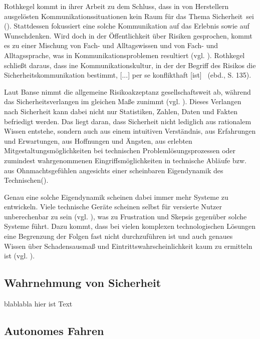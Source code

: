 Rothkegel kommt in ihrer Arbeit zu dem Schluss, dass in von Herstellern ausgelösten Kommunikationssituationen \glqq kein Raum für das Thema Sicherheit\grqq \, sei (\cite[132]{rothkegel2013sicherheitskommunikation}). Stattdessen fokussiert eine solche Kommunikation auf das Erlebnis sowie auf Wunschdenken. Wird doch in der Öffentlichkeit über Risiken gesprochen, kommt es zu einer Mischung von Fach- und Alltagswissen und von Fach- und Alltagssprache, was in Kommunikationsproblemen resultiert (vgl. \cite[134]{rothkegel2013sicherheitskommunikation}). Rothkegel schließt daraus, dass \glqq [e]ine Kommunikationskultur, in der der Begriff des Risikos die Sicherheitskommunikation bestimmt, [...] per se konflikthaft [ist] \grqq \, (ebd., S. 135).

Laut Banse nimmt die allgemeine Risikoakzeptanz gesellschaftsweit ab, während das Sicherheitsverlangen im gleichen Maße zunimmt (vgl. \cite[3]{banse2018technik}). Dieses Verlangen nach Sicherheit kann dabei nicht nur Statistiken, Zahlen, Daten und Fakten befriedigt werden. Das liegt daran, dass Sicherheit nicht lediglich aus rationalem Wissen entstehe, sondern auch aus \glqq einem intuitiven Verständnis, aus Erfahrungen und Erwartungen, aus Hoffnungen und Ängsten, aus erlebten Mitgestaltungsmöglichkeiten bei technischen Problemlösungsprozessen oder zumindest wahrgenommenen Eingriffsmöglichkeiten in technische Abläufe bzw. aus Ohnmachtsgefühlen angesichts einer scheinbaren Eigendynamik des Technischen\grqq (\cite[4]{banse2018technik}).

Genau eine solche Eigendynamik scheinen dabei immer mehr Systeme zu entwickeln. Viele technische Geräte scheinen selbst für versierte Nutzer unberechenbar zu sein (vgl. \cite[5]{norman2013design}), was zu Frustration und Skepsis gegenüber solche Systeme führt. Dazu kommt, dass bei vielen komplexen technologischen Lösungen eine Begrenzung der Folgen fast nicht durchzuführen ist und auch genaues Wissen über Schadensausmaß und Eintrittswahrscheinlichkeit kaum zu ermitteln ist (vgl. \cite[12]{banse2018technik}).

\subsection{Wahrnehmung von Sicherheit}
blablabla hier ist Text

\subsection{Autonomes Fahren}

